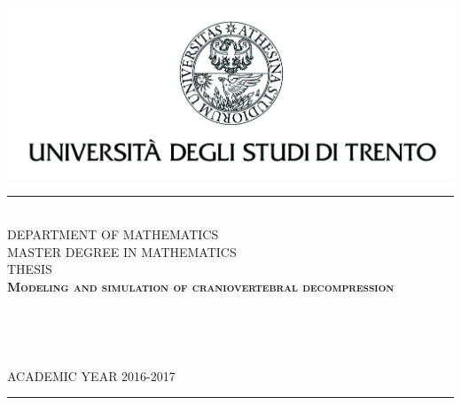 \documentclass[11pt,a4paper,titlepage]{report}
\begin{document}

\begin{titlepage}
\begin{center}
\vspace*{-2.7cm}
\includegraphics{images/aquila_nome}
\\
\rule{\textwidth}{1pt}
\\[0.5cm]
{\Large DEPARTMENT OF MATHEMATICS}
\\[0.35cm]
{\Large MASTER DEGREE IN MATHEMATICS}
\\[2.3cm]
{\Large THESIS}
\\[1.5cm]
\textsc{\huge \textbf{Modeling and simulation of craniovertebral decompression}}
\\[4.5cm]
\begin{minipage}{0.5\textwidth}
\\
\end{minipage}
\begin{minipage}{0.45\textwidth}
 \\
\end{minipage}

\vspace*{\fill}
{\Large ACADEMIC YEAR 2016-2017}
\rule{\textwidth}{1pt}


\end{center}
\newpage
\thispagestyle{empty}
\phantom{}
\end{titlepage}
\newpage
\thispagestyle{empty}
\end{document}
